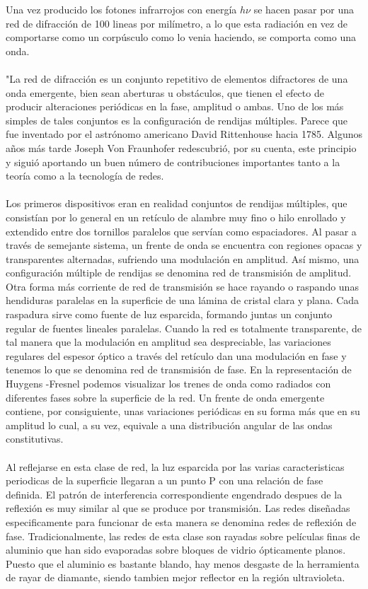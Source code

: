 \documentclass[12]{article}
\begin{document}
\begin{multicols}{2}
Una vez producido los fotones infrarrojos con energía $h\nu$ se hacen pasar por una red de difracción de 100 lineas por milímetro, a lo que esta radiación en vez de comportarse como un corpúsculo como lo venia haciendo, se comporta como una onda.
\\ \\
"La red de difracción es un conjunto repetitivo de elementos difractores de una onda emergente, bien sean aberturas u obstáculos, que tienen el efecto de producir alteraciones periódicas en la fase, amplitud o ambas. Uno de los más simples de tales conjuntos es la configuración de rendijas múltiples. Parece que fue inventado por el astrónomo americano David Rittenhouse hacia 1785. Algunos años más tarde Joseph Von Fraunhofer redescubrió, por su cuenta, este principio y siguió aportando un buen número de contribuciones importantes tanto a la teoría como a la tecnología de redes.\\ \\ 
Los primeros dispositivos eran en realidad conjuntos de rendijas múltiples, que consistían por lo general en un retículo de alambre muy fino o hilo enrollado y extendido entre dos tornillos paralelos que servían como espaciadores. Al pasar a través de semejante sistema, un frente de onda se encuentra con regiones opacas y transparentes alternadas, sufriendo una modulación en amplitud. Así mismo, una configuración múltiple de rendijas se denomina red de transmisión de amplitud. Otra forma más corriente de red de transmisión se hace rayando o raspando  unas hendiduras paralelas en la superficie de una lámina de cristal clara y plana. Cada raspadura sirve como fuente de luz esparcida, formando juntas un conjunto regular de fuentes lineales paralelas. Cuando la red es totalmente transparente, de tal manera que la modulación en amplitud sea despreciable, las variaciones regulares del espesor óptico a través del retículo dan una modulación en fase y tenemos lo que se denomina red de transmisión de fase. En la representación de Huygens -Fresnel podemos visualizar los trenes de onda como radiados con diferentes fases sobre la superficie de la red. Un frente de onda emergente contiene, por consiguiente, unas variaciones periódicas en su forma más que en su amplitud lo cual, a su vez, equivale a una distribución angular de las ondas constitutivas. \\ \\
Al reflejarse en esta clase de red, la luz esparcida por las varias caracteristicas periodicas de la superficie llegaran a un punto P con una relación de fase definida. El patrón de interferencia correspondiente engendrado despues de la reflexión es muy similar al que se produce por transmisión. Las redes diseñadas especificamente para funcionar de esta manera se denomina redes de reflexión de fase. Tradicionalmente, las redes de esta clase son rayadas sobre películas finas de aluminio que han sido evaporadas sobre bloques de vidrio ópticamente planos. Puesto que el aluminio es bastante blando, hay menos desgaste de la herramienta de rayar de diamante, siendo tambien mejor reflector en la región ultravioleta. \\ \\

\end{multicols}
\end{document}
